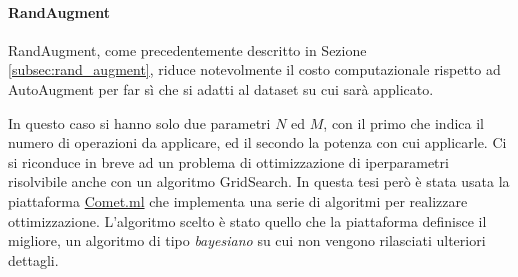 \begin{table}[]
    \caption{Test di RetinaNet su \ac{kmpd} dopo un fine tuning partendo dai pesi del precedente addestramento realizzato su FLIR con AutoAugment V2.}
    \label{table:fine_tuning_aav2_kaist}
\end{table}

\paragraph{RandAugment} 
RandAugment, come precedentemente descritto in Sezione \ref{subsec:rand_augment}, riduce notevolmente il costo computazionale rispetto ad AutoAugment per far sì che si adatti al dataset su cui sarà applicato. 

In questo caso si hanno solo due parametri $N$ ed $M$, con il primo che indica il numero di operazioni da applicare, ed il secondo la potenza con cui applicarle. Ci si riconduce in breve ad un problema di ottimizzazione di iperparametri risolvibile anche con un algoritmo GridSearch. In questa tesi però è stata usata la piattaforma \href{http://www.comet.ml}{Comet.ml} che implementa una serie di algoritmi per realizzare ottimizzazione. L'algoritmo scelto è stato quello che la piattaforma definisce il migliore, un algoritmo di tipo \textit{bayesiano} su cui non vengono rilasciati ulteriori dettagli.

